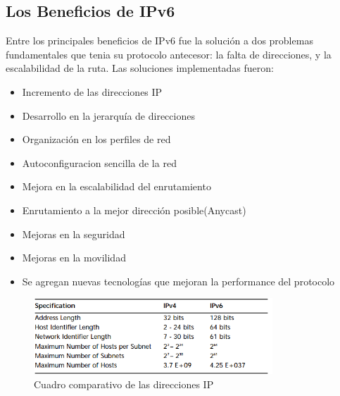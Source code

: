 \documentclass[11pt,a4paper]{article}
\begin{document}
\subsection{Los Beneficios de IPv6}
Entre los principales beneficios de IPv6 fue la solución a dos problemas fundamentales que tenia su 
protocolo antecesor: la falta de direcciones, y la escalabilidad de la ruta. Las soluciones 
implementadas fueron:
\begin{itemize}
\item Incremento de las direcciones IP
\item Desarrollo en la jerarquía de direcciones
\item Organización en los perfiles de red
\item Autoconfiguracion sencilla de la red
\item Mejora en la escalabilidad del enrutamiento
\item Enrutamiento a la mejor dirección posible(Anycast)
\item Mejoras en la seguridad
\item Mejoras en la movilidad
\item Se agregan nuevas tecnologías que mejoran la performance del protocolo

\end {itemize}

\begin{figure}[h!]
 \centering
 \includegraphics[width=0.8\textwidth]{comparativo_ip.png}
\caption[comparacion versiones IP]{Cuadro comparativo de las direcciones IP}
\end{figure} \par
\end{document}
